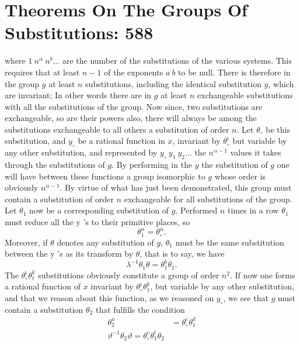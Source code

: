 \documentclass[11pt,fancy]{elegantbook}
\begin{document}
\section{Theorems On The Groups Of Substitutions: 588}

where $1 \ n^\alpha \ n^b \dots$ are the number of the substitutions of the various systems. This requires that at least $n-1$ of the exponents $a \ b$ to be null. There is therefore in the group $g$ at least $n$ substitutions, including the identical substitution $y$, which are invariant; In other words there are in $g$ at least $n$ exchangeable substitutions with all the substitutions of the group. Now since, two substitutions are exchangeable, so are their powers also, there will always be among the substitutions exchangeable to all others a substitution of order $n$. Let $\theta_\circ$ be this substitution, and $y_\circ$ be a rational function in $x$, invariant by $\theta_\circ^{\imath}$ but variable by any other substitution, and represented by $y_\circ \ y_1 \ y_2 \dots$ the $n^{\alpha - 1}$ values it takes through the substitutions of $g$. By performing in the $y$ the substitution of $g$ one will have between these functions a group isomorphic to $g$ whose order is obviously $n^{\alpha - 1}$. By virtue of what has just been demonstrated, this group must contain a substitution of order $n$ exchangeable for all substitutions of the group. Let $\theta_1$ now be a corresponding substitution of $g$. Performed $n$ times in a row $\theta_1$ must reduce all the y \rq s to their primitive places, so
\begin{equation}
    \theta_1^{n}=\theta_\circ^{\alpha}.
\end{equation}
Moreover, if $\theta$ denotes any substitution of $g$, $\theta_1$ must be the same substitution between the y \rq s as its transform by $\theta$, that is to say, we have
\begin{equation}
    \lambda^{-1}\theta_1\theta=\theta_1^{b}\theta_1.
\end{equation}
The $\theta_\circ^{\imath}\theta_\ell^{k}$ substitutions obviously constitute a group of order $n^2$. If now one forms a rational function of $x$ invariant by  $\theta_\circ^{\imath}\theta_1^{k}$, but variable by any other substitution, and that we reason about this function, as we reasoned on $y_\circ$, we see that $g$ must contain a substitution $\theta_2$ that fulfills the condition 
\begin{equation}
\begin{aligned}
    \theta_2^{n}&=\theta_\circ^{c}\theta_1^{d} \\
    \vartheta^{-1}\theta_2\vartheta=\theta_\circ^{e}\theta_1^{t}\theta_2
\end{aligned}
\end{equation}
\end{document}
